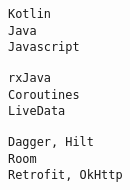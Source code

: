 \documentclass[9pt]{developercv} %
\begin{document}
\begin{minipage}[t]{0.3\textwidth}
	\vspace{-\baselineskip} %
	\texttt{Kotlin}\\
	\texttt{Java}\\
	\texttt{Javascript}\\
\end{minipage}
\hfill
\begin{minipage}[t]{0.3\textwidth}
	\vspace{-\baselineskip} %
		
	\texttt{rxJava}\\
	\texttt{Coroutines}\\
	\texttt{LiveData}\\
	
\end{minipage}
\hfill
\begin{minipage}[t]{0.3\textwidth}
	\vspace{-\baselineskip} %
		
	\texttt{Dagger, Hilt}\\
	\texttt{Room}\\
	\texttt{Retrofit, OkHttp}\\
\end{minipage}



\end{document}
